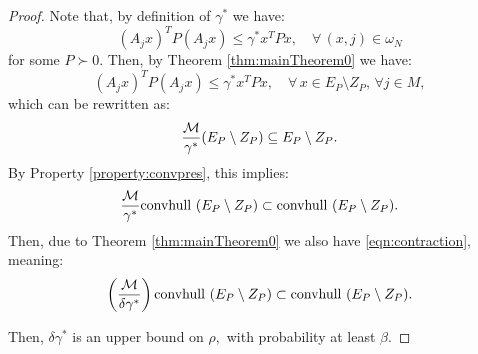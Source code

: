 \begin{proof}Note that, by definition of $\gamma^*$ we have:
\begin{equation*} (A_j x)^TP(A_j x) \leq \gamma^* x^TPx, \quad \forall\, (x, j)  \in \omega_N \end{equation*}
for some $P \succ 0$. Then, by Theorem \ref{thm:mainTheorem0} we have:
\begin{equation*} (A_j x)^TP(A_j x) \leq \gamma^*x^TPx, \quad \forall\, x \in E_P \setminus Z_P,\, \forall j \in M, \end{equation*}
which can be rewritten as:
\begin{equation*}\frac{\mathcal{M}}{\gamma^*}(E_P \setminus Z_P) \subseteq E_P \setminus Z_P.
\end{equation*}
By Property \ref{property:convpres}, this implies:
$$\frac{\mathcal{M}}{\gamma^*} \mbox{convhull }(E_P \setminus Z_P) \subset \mbox{convhull }(E_P \setminus Z_P).$$
Then, due to Theorem \ref{thm:mainTheorem0} we also have \eqref{eqn:contraction}, meaning:
$$\left(\frac{\mathcal{M}}{\delta \gamma^*}\right) \mbox{convhull } (E_P \setminus Z_P) \subset \mbox{convhull } (E_P\setminus Z_P).$$

Then, $\delta\gamma^*$ is an upper bound on $\rho,$ with probability at least $\beta$. 
\end{proof}
